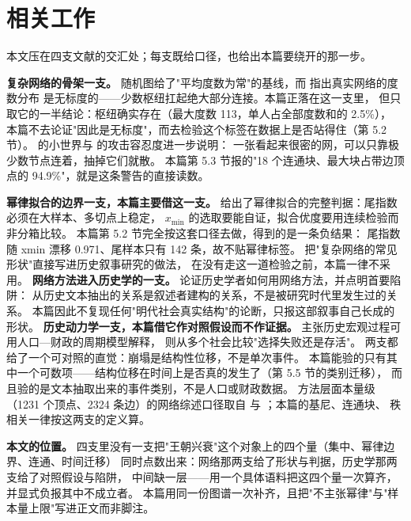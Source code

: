 \section{相关工作}

本文压在四支文献的交汇处；每支既给口径，也给出本篇要绕开的那一步。

\textbf{复杂网络的骨架一支。}
随机图给了"平均度数为常"的基线，而 \citet{barabasi1999} 指出真实网络的度数分布
是无标度的——少数枢纽扛起绝大部分连接。本篇正落在这一支里，
但只取它的一半结论：枢纽确实存在（最大度数 113，单人占全部度数和的 2.5\%），
本篇不去论证"因此是无标度"，而去检验这个标签在数据上是否站得住（第 5.2 节）。
\citet{watts1998} 的小世界与 \citet{albert2000} 的攻击容忍度进一步说明：
一张看起来很密的网，可以只靠极少数节点连着，抽掉它们就散。
本篇第 5.3 节报的"18 个连通块、最大块占带边顶点的 94.9\%"，就是这条警告的直接读数。

\textbf{幂律拟合的边界一支，本篇主要借这一支。}
\citet{clauset2009} 给出了幂律拟合的完整判据：尾指数必须在大样本、多切点上稳定，
$x_{\min}$ 的选取要能自证，拟合优度要用连续检验而非分箱比较。
本篇第 5.2 节完全按这套口径去做，得到的是一条负结果：
尾指数随 xmin 漂移 0.971、尾样本只有 142 条，故不贴幂律标签。
把"复杂网络的常见形状"直接写进历史叙事研究的做法，
在没有走这一道检验之前，本篇一律不采用。
\textbf{网络方法进入历史学的一支。}
\citet{lemercier2015} 论证历史学者如何用网络方法，并点明首要陷阱：
从历史文本抽出的关系是叙述者建构的关系，不是被研究时代里发生过的关系。
本篇因此不复现任何"明代社会真实结构"的论断，只报这部叙事自己长成的形状。
\textbf{历史动力学一支，本篇借它作对照假设而不作证据。}
\citet{turchin2003} 主张历史宏观过程可用人口—财政的周期模型解释，
\citet{diamond2005} 则从多个社会比较"选择失败还是存活"。
两支都给了一个可对照的直觉：崩塌是结构性位移，不是单次事件。
本篇能验的只有其中一个可数项——结构位移在时间上是否真的发生了（第 5.5 节的类别迁移），
而且验的是文本抽取出来的事件类别，不是人口或财政数据。
方法层面本量级（1231 个顶点、2324 条边）的网络综述口径取自
\citet{newman2005} 与 \citet{wasserman1994}；本篇的基尼、连通块、
秩相关一律按这两支的定义算。

\textbf{本文的位置。}
四支里没有一支把"王朝兴衰"这个对象上的四个量（集中、幂律边界、连通、时间迁移）
同时点数出来：网络那两支给了形状与判据，历史学那两支给了对照假设与陷阱，
中间缺一层——用一个具体语料把这四个量一次算齐，并显式负报其中不成立者。
本篇用同一份图谱一次补齐，且把"不主张幂律"与"样本量上限"写进正文而非脚注。
